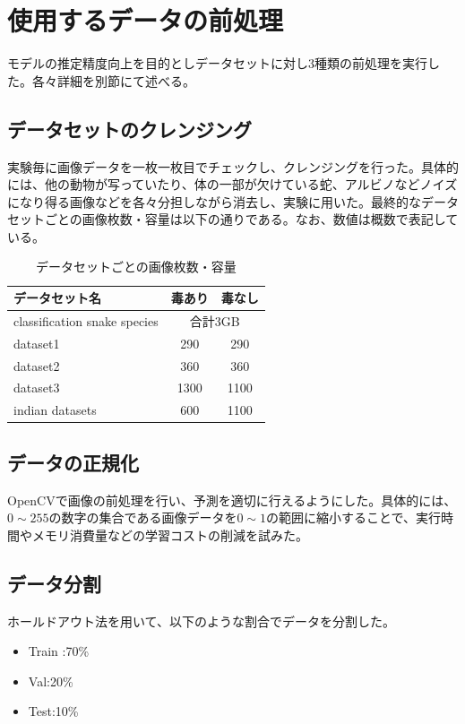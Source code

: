 \documentclass[a4paper, 11pt, titlepage]{jsarticle}
\begin{document}
\section{使用するデータの前処理}
モデルの推定精度向上を目的としデータセットに対し3種類の前処理を実行した。各々詳細を別節にて述べる。

\subsection{データセットのクレンジング}
実験毎に画像データを一枚一枚目でチェックし、クレンジングを行った。具体的には、他の動物が写っていたり、体の一部が欠けている蛇、アルビノなどノイズになり得る画像などを各々分担しながら消去し、実験に用いた。最終的なデータセットごとの画像枚数・容量は以下の通りである。なお、数値は概数で表記している。

\clearpage

\begin{table}[htb]
\centering
  \caption{データセットごとの画像枚数・容量}
  \begin{tabular}{|l|c|c|}  \hline
    データセット名 & 毒あり & 毒なし \\ \hline \hline
    classification snake species & \multicolumn{2}{|c|}{合計3GB} \\ \hline
    dataset1 & 290 & 290 \\ \hline
    dataset2 & 360 & 360 \\ \hline
    dataset3 & 1300 & 1100 \\ \hline
    indian datasets & 600 & 1100 \\ \hline
  \end{tabular}
\end{table}

\subsection{データの正規化}
OpenCVで画像の前処理を行い、予測を適切に行えるようにした。具体的には、$0\sim255$の数字の集合である画像データを$0\sim1$の範囲に縮小することで、実行時間やメモリ消費量などの学習コストの削減を試みた。

\subsection{データ分割}
ホールドアウト法を用いて、以下のような割合でデータを分割した。\par
\begin{itemize}
\item Train :70\%
\item Val:20\%
\item Test:10\%
\end{itemize}
\end{document}
